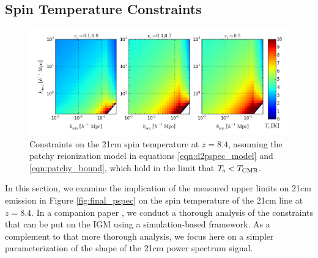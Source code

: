 \documentclass[twocolumn,numberedappendix]{emulateapj} \shorttitle{PSA64}
\begin{document}
\subsection{Spin Temperature Constraints}

\begin{figure}\centering
\includegraphics[width=2\columnwidth]{plots/ts_patchy_bound.png}
\caption{Constraints on the 21cm spin temperature at $z=8.4$, 
assuming 
the patchy reionization model in equations
\ref{eqn:d2pspec_model} and \ref{eqn:patchy_bound}, which hold in the limit
that $T_{\rm s}<T_{\rm CMB}$.
} \label{fig:patchy_bound}
\end{figure}

In this section, we examine the implication of the measured upper limits
on 21cm emission in Figure \ref{fig:final_pspec} on the spin temperature
of the 21cm line at $z=8.4$.
In a companion paper \citet{pober_et_al2015}, we conduct a thorough analysis of the
constraints that can be put on the IGM using a simulation-based framework.
As a complement to that more thorough
analysis, we focus here on a simpler parameterization of the shape
of the 21cm power spectrum signal. 
\end{document}
